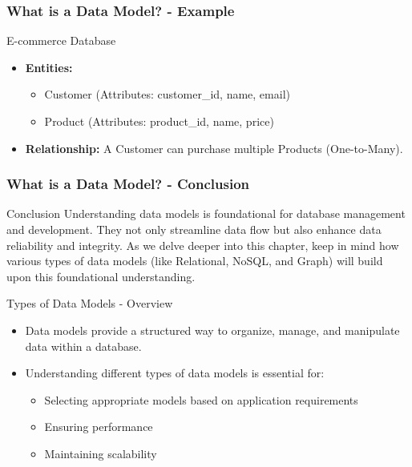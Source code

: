 \documentclass[aspectratio=169]{beamer}
\begin{document}
\begin{frame}[fragile]
    \frametitle{What is a Data Model? - Example}
    \begin{block}{E-commerce Database}
        \begin{itemize}
            \item \textbf{Entities:}
            \begin{itemize}
                \item Customer (Attributes: customer\_id, name, email)
                \item Product (Attributes: product\_id, name, price)
            \end{itemize}
            
            \item \textbf{Relationship:} 
            A Customer can purchase multiple Products (One-to-Many).
        \end{itemize}
    \end{block}
\end{frame}

\begin{frame}[fragile]
    \frametitle{What is a Data Model? - Conclusion}
    \begin{block}{Conclusion}
        Understanding data models is foundational for database management and development. 
        They not only streamline data flow but also enhance data reliability and integrity. 
        As we delve deeper into this chapter, keep in mind how various types of data models (like Relational, NoSQL, and Graph) will build upon this foundational understanding.
    \end{block}
\end{frame}

\begin{frame}[fragile]{Types of Data Models - Overview}
    \begin{itemize}
        \item Data models provide a structured way to organize, manage, and manipulate data within a database.
        \item Understanding different types of data models is essential for:
        \begin{itemize}
            \item Selecting appropriate models based on application requirements
            \item Ensuring performance
            \item Maintaining scalability
        \end{itemize}
    \end{itemize}
\end{frame}
\end{document}
